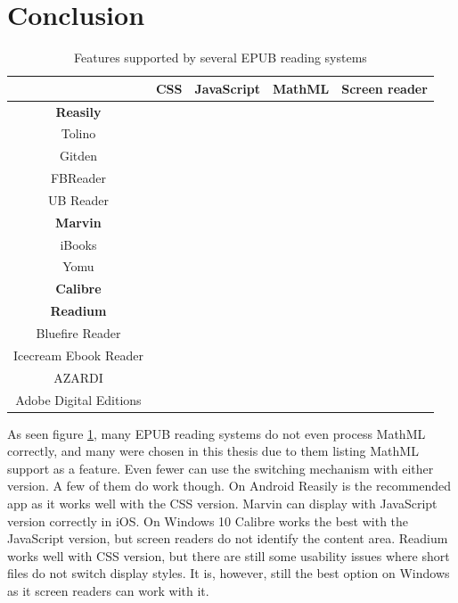 \section{Conclusion}
\begin{table}
	\centering
	\caption{Features supported by several EPUB reading systems}
	\begin{tabular}{| c | c | c | c | c |}
		\hline
		& CSS & JavaScript & MathML & Screen reader \\ \hline
		\textbf{Reasily} & \cmark & \xmark & \cmark & \cmark \\  \hline
		Tolino & \xmark & \xmark & \xmark & \xmark \\ \hline
		Gitden & \xmark & \xmark & \cmark & \cmark \\ \hline
		FBReader & \xmark & \xmark & \xmark & \xmark \\ \hline
		UB Reader & \xmark & \xmark & \xmark & \xmark \\ \hline
		
		\textbf{Marvin} & \xmark & \cmark & \cmark & \cmark \\ \hline
		iBooks & \xmark & \xmark & \cmark & \cmark \\ \hline
		Yomu & \xmark & \xmark & \cmark & \cmark \\ \hline
		
		\textbf{Calibre} & \xmark & \cmark & \cmark & \xmark \\ \hline
		\textbf{Readium} & \cmark & \xmark & \cmark & \cmark \\ \hline		
		Bluefire Reader & \xmark & \xmark & \xmark & \xmark \\ \hline
		Icecream Ebook Reader & \xmark & \xmark & \xmark & \xmark \\ \hline
		AZARDI & \xmark & \xmark & \cmark & \cmark \\ \hline		
		Adobe Digital Editions & \xmark & \xmark & \cmark & \cmark \\ \hline
		
	\end{tabular}
	\label{fig:table}
\end{table}

As seen figure \ref{fig:table}, many EPUB reading systems do not even process MathML correctly, and many were chosen in this thesis due to them listing MathML support as a feature. Even fewer can use the switching mechanism with either version. A few of them do work though. On Android Reasily is the recommended app as it works well with the CSS version. Marvin can display with JavaScript version correctly in iOS. On Windows 10 Calibre works the best with the JavaScript version, but screen readers do not identify the content area. Readium works well with CSS version, but there are still some usability issues where short files do not switch display styles. It is, however, still the best option on Windows as it screen readers can work with it.